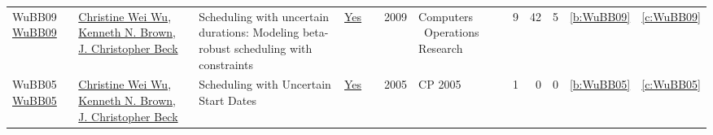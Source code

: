 {\begin{longtable}{>{\raggedright\arraybackslash}p{3cm}>{\raggedright\arraybackslash}p{6cm}>{\raggedright\arraybackslash}p{6.5cm}rrrp{2.5cm}rrrrr}
WuBB09 \href{https://doi.org/10.1016/j.cor.2008.08.008}{WuBB09} & \hyperref[auth:a277]{Christine Wei Wu}, \hyperref[auth:a223]{Kenneth N. Brown}, \hyperref[auth:a89]{J. Christopher Beck} & Scheduling with uncertain durations: Modeling beta-robust scheduling with constraints & \href{works/WuBB09.pdf}{Yes} & \cite{WuBB09} & 2009 & Computers \  Operations Research & 9 & 42 & 5 & \ref{b:WuBB09} & \ref{c:WuBB09}\\
WuBB05 \href{https://doi.org/10.1007/11564751\_110}{WuBB05} & \hyperref[auth:a277]{Christine Wei Wu}, \hyperref[auth:a223]{Kenneth N. Brown}, \hyperref[auth:a89]{J. Christopher Beck} & Scheduling with Uncertain Start Dates & \href{works/WuBB05.pdf}{Yes} & \cite{WuBB05} & 2005 & CP 2005 & 1 & 0 & 0 & \ref{b:WuBB05} & \ref{c:WuBB05}\\
\end{longtable}
}

